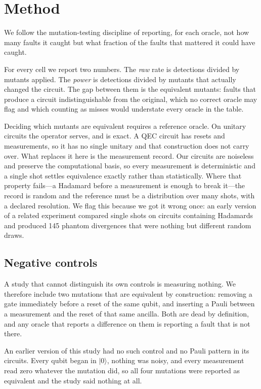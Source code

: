 \documentclass[twocolumn,10pt]{article}
\begin{document}
\section{Method}

We follow the mutation-testing discipline of reporting, for each oracle, not how
many faults it caught but what fraction of the faults that mattered it could
have caught.

For every cell we report two numbers. The \emph{raw} rate is detections divided
by mutants applied. The \emph{power} is detections divided by mutants that
actually changed the circuit. The gap between them is the equivalent mutants:
faults that produce a circuit indistinguishable from the original, which no
correct oracle may flag and which counting as misses would understate every
oracle in the table.

Deciding which mutants are equivalent requires a reference oracle. On unitary
circuits the operator serves, and is exact. A QEC circuit has resets and
measurements, so it has no single unitary and that construction does not carry
over. What replaces it here is the measurement record. Our circuits are
noiseless and preserve the computational basis, so every measurement is
deterministic and a single shot settles equivalence exactly rather than
statistically. Where that property fails---a Hadamard before a measurement is
enough to break it---the record is random and the reference must be a
distribution over many shots, with a declared resolution. We flag this because
we got it wrong once: an early version of a related experiment compared single
shots on circuits containing Hadamards and produced 145 phantom divergences that
were nothing but different random draws.

\subsection{Negative controls}

A study that cannot distinguish its own controls is measuring nothing. We
therefore include two mutations that are equivalent by construction: removing a
gate immediately before a reset of the same qubit, and inserting a Pauli between
a measurement and the reset of that same ancilla. Both are dead by definition,
and any oracle that reports a difference on them is reporting a fault that is
not there.

An earlier version of this study had no such control and no Pauli pattern in its
circuits. Every qubit began in $|0\rangle$, nothing was noisy, and every
measurement read zero whatever the mutation did, so all four mutations were
reported as equivalent and the study said nothing at all.
\end{document}

